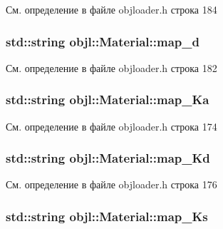 См. определение в файле objloader.\+h строка 184

\subsubsection[{\texorpdfstring{map\+\_\+d}{map_d}}]{\setlength{\rightskip}{0pt plus 5cm}std\+::string objl\+::\+Material\+::map\+\_\+d}\hypertarget{structobjl_1_1_material_a1e3769e9fc62f4ba49e4888428931c9f}{}\label{structobjl_1_1_material_a1e3769e9fc62f4ba49e4888428931c9f}


См. определение в файле objloader.\+h строка 182

\subsubsection[{\texorpdfstring{map\+\_\+\+Ka}{map_Ka}}]{\setlength{\rightskip}{0pt plus 5cm}std\+::string objl\+::\+Material\+::map\+\_\+\+Ka}\hypertarget{structobjl_1_1_material_a993d3394b3aa0116ac2031f870eda49b}{}\label{structobjl_1_1_material_a993d3394b3aa0116ac2031f870eda49b}


См. определение в файле objloader.\+h строка 174

\subsubsection[{\texorpdfstring{map\+\_\+\+Kd}{map_Kd}}]{\setlength{\rightskip}{0pt plus 5cm}std\+::string objl\+::\+Material\+::map\+\_\+\+Kd}\hypertarget{structobjl_1_1_material_a84fe6a74e5a48a18a875431519a5c2e9}{}\label{structobjl_1_1_material_a84fe6a74e5a48a18a875431519a5c2e9}


См. определение в файле objloader.\+h строка 176

\subsubsection[{\texorpdfstring{map\+\_\+\+Ks}{map_Ks}}]{\setlength{\rightskip}{0pt plus 5cm}std\+::string objl\+::\+Material\+::map\+\_\+\+Ks}\hypertarget{structobjl_1_1_material_a6ec9644f4152d4e60c471cb2df021345}{}\label{structobjl_1_1_material_a6ec9644f4152d4e60c471cb2df021345}


